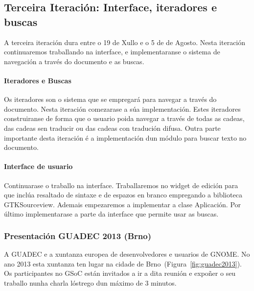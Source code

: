 \subsection{Terceira Iteración: Interface, iteradores e buscas}
A terceira iteración dura entre o 19 de Xullo e o 5 de de Agosto. Nesta iteración continuaremos traballando na interface, e implementaranse o sistema de navegación a través do documento e as buscas.

\paragraph{Iteradores e Buscas}
Os iteradores son o sistema que se empregará para navegar a través do documento. Nesta iteración comezarase a súa implementación. Estes iteradores construiranse de forma que o usuario poida navegar a través de todas as cadeas, das cadeas sen traducir ou das cadeas con tradución difusa. Outra parte importante desta iteración é a implementación dun módulo para buscar texto no documento.

\paragraph{Interface de usuario}
Continuarase o traballo na interface. Traballaremos no widget de edición para que inclúa resaltado de sintaxe e de espazos en branco empregando a biblioteca GTKSourceview. Ademais empezaremos a implementar a clase Aplicación. Por último implementarase a parte da interface que permite usar as buscas.


\subsubsection{Presentación GUADEC 2013 (Brno)}
A GUADEC e a xuntanza europea de desenvolvedores e usuarios de GNOME. No ano 2013 esta xuntanza ten lugar na cidade de Brno~(Figura~\ref{fig:guadec2013}). Os participantes no GSoC están invitados a ir a dita reunión e expoñer o seu traballo nunha charla lóstrego dun máximo de 3 minutos.

